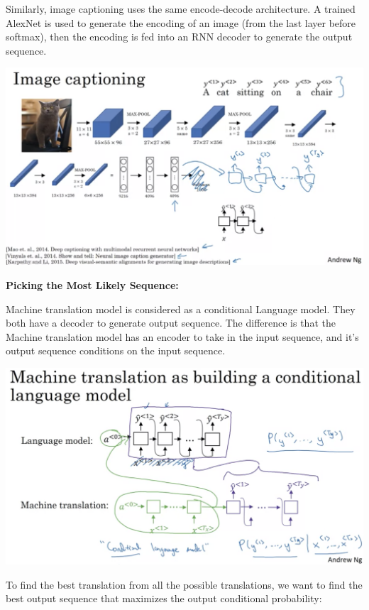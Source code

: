 \documentclass{article}
\begin{document}
\noindent Similarly, image captioning uses the same encode-decode architecture. A trained AlexNet is used to generate the encoding of an image (from the last layer before softmax), then the encoding is fed into an RNN decoder to generate the output sequence.

\begin{center}
\includegraphics[scale=0.3]{./images/image_captioning.png}
\end{center}

\noindent \textbf{Picking the Most Likely Sequence:}

\noindent Machine translation model is considered as a conditional Language model. They both have a decoder to generate output sequence. The difference is that the Machine translation model has an encoder to take in the input sequence, and it's output sequence conditions on the input sequence.

\begin{center}
\includegraphics[scale=0.3]{./images/mtm_as_clm.png}
\end{center}

\noindent To find the best translation from all the possible translations, we want to find the best output sequence that maximizes the output conditional probability:
\end{document}
